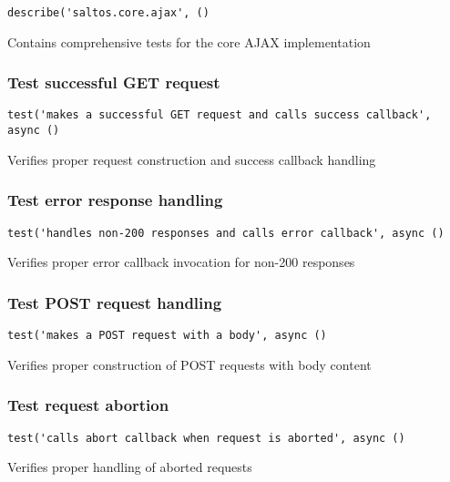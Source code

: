 \documentclass[a4paper]{article}
\begin{document}
\begin{lstlisting}
describe('saltos.core.ajax', ()
\end{lstlisting}

Contains comprehensive tests for the core AJAX implementation

\hypertarget{toc73}{}
\subsubsection{Test successful GET request}

\begin{lstlisting}
test('makes a successful GET request and calls success callback', async ()
\end{lstlisting}

Verifies proper request construction and success callback handling

\hypertarget{toc74}{}
\subsubsection{Test error response handling}

\begin{lstlisting}
test('handles non-200 responses and calls error callback', async ()
\end{lstlisting}

Verifies proper error callback invocation for non-200 responses

\hypertarget{toc75}{}
\subsubsection{Test POST request handling}

\begin{lstlisting}
test('makes a POST request with a body', async ()
\end{lstlisting}

Verifies proper construction of POST requests with body content

\hypertarget{toc76}{}
\subsubsection{Test request abortion}

\begin{lstlisting}
test('calls abort callback when request is aborted', async ()
\end{lstlisting}

Verifies proper handling of aborted requests
\end{document}
